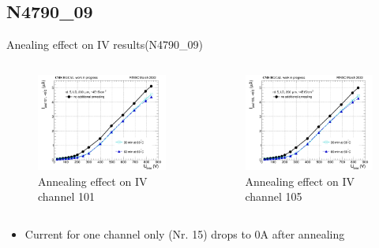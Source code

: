 \documentclass{beamer}
\begin{document}
\subsection{N4790\_09}

\begin{frame}{Anealing effect on IV results(N4790\_09) }
  \begin{columns}
       \begin{figure}
           \includegraphics[width=1.0\textwidth]{plots/8in_198ch_2019_N4790_09_4E15_neg40degC_annealing_IV_ch101.png}
           \caption{Annealing effect on IV channel 101 }
       \end{figure}
       \begin{figure}
           \includegraphics[width=1.0\textwidth]{plots/8in_198ch_2019_N4790_09_4E15_neg40degC_annealing_IV_ch105.png}
           \caption{Annealing effect on IV channel 105}
       \end{figure}
   \end{columns}
   \begin{itemize}
      \item Current for one channel only (Nr. 15) drops to 0A after annealing
   \end{itemize}
\end{frame}
\end{document}
